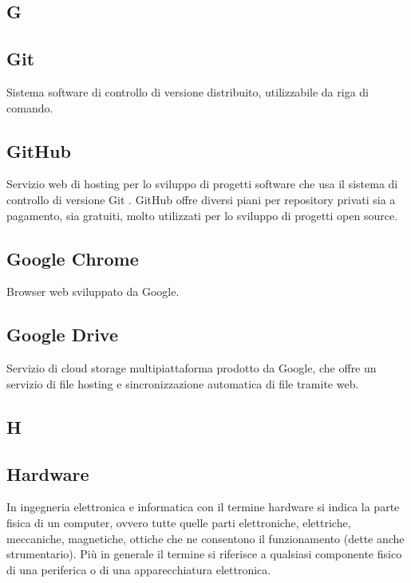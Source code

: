 \newpage

\begin{center}
\Huge\section*{\uppercase{G}}
\end{center}

\subsection*{Git}
Sistema software di controllo di versione distribuito, utilizzabile da riga di comando.

\subsection*{GitHub}
Servizio web di hosting per lo sviluppo di progetti software che usa il sistema di controllo
di versione Git . GitHub offre diversi piani per repository privati sia a pagamento, sia
gratuiti, molto utilizzati per lo sviluppo di progetti open source.

\subsection*{Google Chrome}
Browser web sviluppato da Google.

\subsection*{Google Drive}
Servizio di cloud storage multipiattaforma prodotto da Google, che offre un servizio di file hosting e
sincronizzazione automatica di file tramite web.

\newpage

\begin{center}
\Huge\section*{\uppercase{H}}
\end{center}

\subsection*{Hardware}
In ingegneria elettronica e informatica con il termine hardware si indica la parte fisica
di un computer, ovvero tutte quelle parti elettroniche, elettriche, meccaniche, magnetiche,
ottiche che ne consentono il funzionamento (dette anche strumentario). Più in generale il
termine si riferisce a qualsiasi componente fisico di una periferica o di una apparecchiatura
elettronica.

